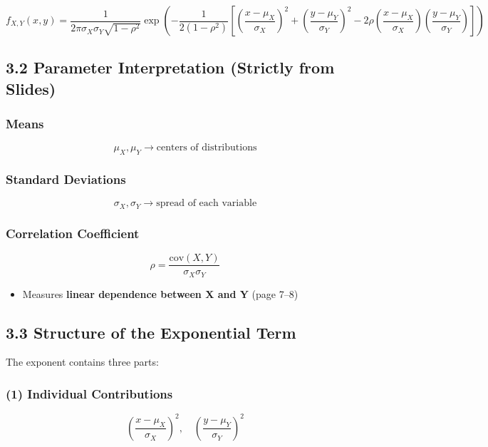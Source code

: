 \documentclass[11pt]{article}
\begin{document}
\[
f_{X,Y}(x,y)
=
\frac{1}{2\pi \sigma_X \sigma_Y \sqrt{1 - \rho^2}}
\exp \left(
-\frac{1}{2(1 - \rho^2)}
\left[
\left(\frac{x - \mu_X}{\sigma_X}\right)^2
+
\left(\frac{y - \mu_Y}{\sigma_Y}\right)^2
- 2\rho
\left(\frac{x - \mu_X}{\sigma_X}\right)
\left(\frac{y - \mu_Y}{\sigma_Y}\right)
\right]
\right)
\]

\subsection*{3.2 Parameter Interpretation (Strictly from Slides)}

\subsubsection*{Means}

\[
\mu_X, \mu_Y \rightarrow \text{centers of distributions}
\]

\subsubsection*{Standard Deviations}

\[
\sigma_X, \sigma_Y \rightarrow \text{spread of each variable}
\]

\subsubsection*{Correlation Coefficient}

\[
\rho = \frac{\text{cov}(X,Y)}{\sigma_X \sigma_Y}
\]

\begin{itemize}
\item Measures \textbf{linear dependence between X and Y} (page 7--8)
\end{itemize}

\subsection*{3.3 Structure of the Exponential Term}

The exponent contains three parts:

\subsubsection*{(1) Individual Contributions}

\[
\left(\frac{x - \mu_X}{\sigma_X}\right)^2, \quad
\left(\frac{y - \mu_Y}{\sigma_Y}\right)^2
\]
\end{document}
